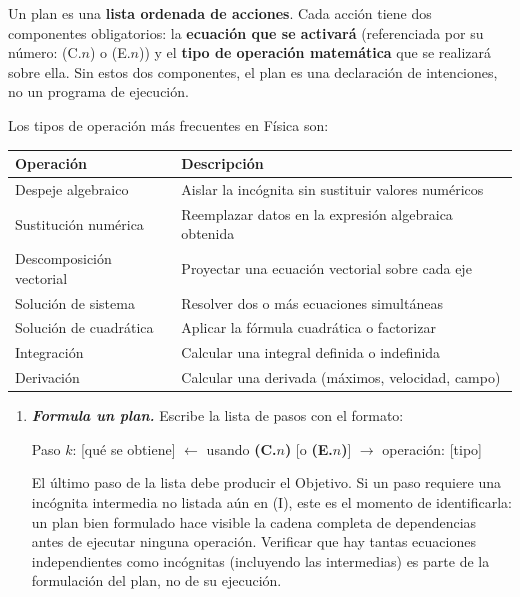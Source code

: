 \documentclass[11pt]{book}
\begin{document}
\begin{enumerate}
Un plan es una {\bf lista ordenada de acciones}. Cada acción tiene dos componentes obligatorios: la {\bf ecuación que se activará} (referenciada por su número: (C.$n$) o (E.$n$)) y el {\bf tipo de operación matemática} que se realizará sobre ella. Sin estos dos componentes, el plan es una declaración de intenciones, no un programa de ejecución.

Los tipos de operación más frecuentes en Física son:

\begin{center}
\small
\begin{tabular}{ll}
\hline
\textbf{Operación} & \textbf{Descripción} \\
\hline
Despeje algebraico     & Aislar la incógnita sin sustituir valores numéricos \\
Sustitución numérica   & Reemplazar datos en la expresión algebraica obtenida \\
Descomposición vectorial & Proyectar una ecuación vectorial sobre cada eje \\
Solución de sistema    & Resolver dos o más ecuaciones simultáneas \\
Solución de cuadrática & Aplicar la fórmula cuadrática o factorizar \\
Integración            & Calcular una integral definida o indefinida \\
Derivación             & Calcular una derivada (máximos, velocidad, campo) \\
\hline
\end{tabular}
\end{center}

\begin{enumerate}
    \item[I.] {\it\bf Formula un plan.} Escribe la lista de pasos con el formato:

    \medskip
    \noindent\hspace{1em}Paso $k$: [qué se obtiene] $\leftarrow$ usando \textbf{(C.$n$)} [o \textbf{(E.$n$)}] $\rightarrow$ operación: [tipo]

    \medskip
    El último paso de la lista debe producir el Objetivo. Si un paso requiere una incógnita intermedia no listada aún en (I), este es el momento de identificarla: un plan bien formulado hace visible la cadena completa de dependencias antes de ejecutar ninguna operación. Verificar que hay tantas ecuaciones independientes como incógnitas (incluyendo las intermedias) es parte de la formulación del plan, no de su ejecución.
\end{enumerate}



\end{enumerate}
\end{document}
